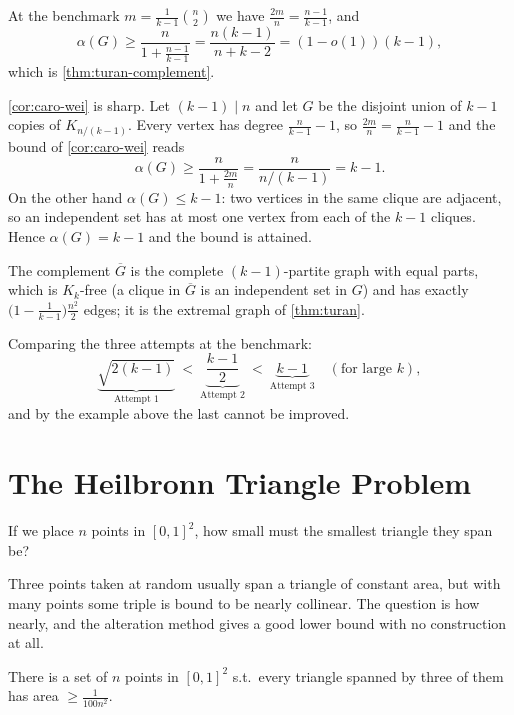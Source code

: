 At the benchmark \(m = \frac{1}{k-1} \binom{n}{2}\) we have \(\frac{2m}{n} = \frac{n-1}{k-1}\), and
\[
    \alpha(G) \ge \frac{n}{1 + \frac{n-1}{k-1}} = \frac{n(k-1)}{n + k - 2} = (1 - o(1)) (k-1),
\]
which is \autoref{thm:turan-complement}.

\begin{remark}
    \autoref{cor:caro-wei} is sharp. Let \((k-1) \mid n\) and let \(G\) be the disjoint union of \(k-1\) copies of \(K_{n/(k-1)}\). Every vertex has degree \(\frac{n}{k-1} - 1\), so \(\frac{2m}{n} = \frac{n}{k-1} - 1\) and the bound of \autoref{cor:caro-wei} reads
    \[
        \alpha(G) \ge \frac{n}{1 + \frac{2m}{n}} = \frac{n}{n/(k-1)} = k - 1.
    \]
    On the other hand \(\alpha(G) \le k-1\): two vertices in the same clique are adjacent, so an independent set has at most one vertex from each of the \(k-1\) cliques. Hence \(\alpha(G) = k-1\) and the bound is attained.

    The complement \(\overline{G}\) is the complete \((k-1)\)-partite graph with equal parts, which is \(K_k\)-free (a clique in \(\overline{G}\) is an independent set in \(G\)) and has exactly \(\bigl(1 - \frac{1}{k-1}\bigr) \frac{n^2}{2}\) edges; it is the extremal graph of \autoref{thm:turan}.

    Comparing the three attempts at the benchmark:
    \[
        \underbrace{\sqrt{2(k-1)}}_{\text{Attempt 1}}
        \ <\ \underbrace{\frac{k-1}{2}}_{\text{Attempt 2}}
        \ <\ \underbrace{k-1}_{\text{Attempt 3}} \quad (\text{for large } k),
    \]
    and by the example above the last cannot be improved.
\end{remark}

\section{The Heilbronn Triangle Problem}\label{sec:heilbronn}

\begin{question}\label{q:heilbronn}
    If we place \(n\) points in \([0,1]^2\), how small must the smallest triangle they span be?
\end{question}

Three points taken at random usually span a triangle of constant area, but with many points some triple is bound to be nearly collinear. The question is how nearly, and the alteration method gives a good lower bound with no construction at all.

\begin{proposition}\label{prop:heilbronn}
    There is a set of \(n\) points in \([0,1]^2\) s.t.\ every triangle spanned by three of them has area \(\ge \frac{1}{100 n^2}\).
\end{proposition}

